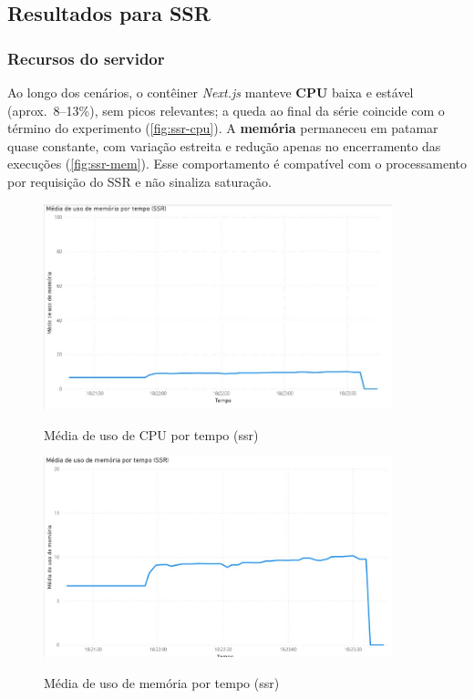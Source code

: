 \subsection{Resultados para SSR}
\label{subsec:resultados-ssr}

\subsubsection{Recursos do servidor}
Ao longo dos cenários, o contêiner \textit{Next.js} manteve \textbf{CPU} baixa e estável (aprox.\ 8--13\%), sem picos relevantes; a queda ao final da série coincide com o término do experimento (\autoref{fig:ssr-cpu}). A \textbf{memória} permaneceu em patamar quase constante, com variação estreita e redução apenas no encerramento das execuções (\autoref{fig:ssr-mem}). Esse comportamento é compatível com o processamento por requisição do SSR e não sinaliza saturação.

\begin{figure}[H]
    \centering
    \caption{Média de uso de CPU por tempo (\acrshort{ssr})}
    \includegraphics[width=0.9\textwidth]{media/uso_cpu_ssr.jpeg}
    \label{fig:ssr-cpu}
\end{figure}

\begin{figure}[H]
    \centering
    \caption{Média de uso de memória por tempo (\acrshort{ssr})}
    \includegraphics[width=0.9\textwidth]{media/uso_memoria_ssr.jpeg}
    \label{fig:ssr-mem}
\end{figure}

